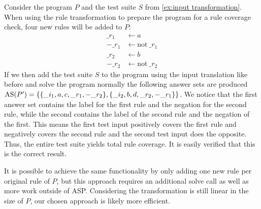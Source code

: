 \begin{example}
\label{ex:rule transformation}
    Consider the program $P$ and the test suite $S$ from \cref{ex:input transformation}. 
    When using the rule transformation to prepare the program for a rule coverage check, four new rules will be added to $P$:
    \begin{align*}
        \_r_1 &\leftarrow a \\
        -\_r_1 &\leftarrow \text{not}\ \_r_1 \\
        \_r_2 &\leftarrow b \\
        -\_r_2 &\leftarrow \text{not}\ \_r_2
    \end{align*}
    If we then add the test suite $S$ to the program using the input translation like before and solve the program normally the following answer sets are produced \(\operatorname{AS}(P') = \{\{\_i_1, a, c, \_r_1, -\_r_2\}, \{\_i_2, b, d, \_r_2, -\_r_1\}\}\). We notice that the first answer set contains the label for the first rule and the negation for the second rule, while the second contains the label of the second rule and the negation of the first. This means the first test input positively covers the first rule and negatively covers the second rule and the second test input does the opposite. Thus, the entire test suite yields total rule coverage. It is easily verified that this is the correct result.
\end{example}

It is possible to achieve the same functionality by only adding one new rule per original rule of $P$, but this approach requires an additional solve call as well as more work outside of ASP. Considering the transformation is still linear in the size of $P$, our chosen approach is likely more efficient.

\begin{comment}
- $\_ri$ label for every rule i     \/

- add new rule to program for each label: $\{\_ri\}$ is the head, the body is identical to the body of the rule i       \/

- example           \/

- if the body of rule i is true in some answer set (aka $X |= B(r_i)$) then rule i is positively covered and $\_ri$ will appear in the answer set       \/

-> $\_ri$ in answer set <=> rule i is positively covered        \/

-> $\_ri$ not in answer set <=> rule i is negatively covered (proof for these?) \/
\end{comment}

